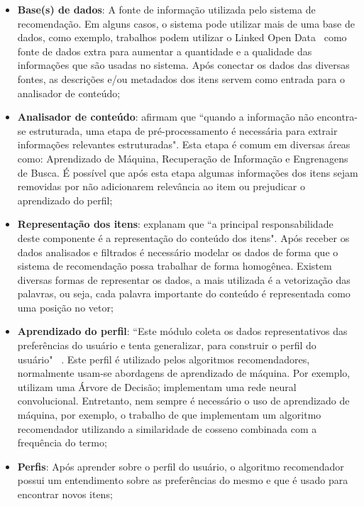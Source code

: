 \begin{itemize}
	\item{\textbf{Base(s) de dados}: A fonte de informação utilizada pelo sistema de recomendação. Em alguns casos, o sistema pode utilizar mais de uma base de dados, como exemplo, trabalhos podem utilizar o Linked Open Data~ \cite{Bizer:2009} como fonte de dados extra para aumentar a quantidade e a qualidade das informações que são usadas no sistema. Após conectar os dados das diversas fontes, as descrições e/ou metadados dos itens servem como entrada para o analisador de conteúdo;
	}

	\item{\textbf{Analisador de conteúdo}:  afirmam que ``quando a informação não encontra-se estruturada, uma etapa de pré-processamento é necessária para extrair informações relevantes estruturadas". Esta etapa é comum em diversas áreas como: Aprendizado de Máquina, Recuperação de Informação e Engrenagens de Busca. É possível que após esta etapa algumas informações dos itens sejam removidas por não adicionarem relevância ao item ou prejudicar o aprendizado do perfil;
	}

	\item{\textbf{Representação dos itens}:  explanam que ``a principal responsabilidade deste componente é a representação do conteúdo dos itens". Após receber os dados analisados e filtrados é necessário modelar os dados de forma que o sistema de recomendação possa trabalhar de forma homogênea. Existem diversas formas de representar os dados, a mais utilizada é a vetorização das palavras, ou seja, cada palavra importante do conteúdo é representada como uma posição no vetor;
	}
	
	\item{\textbf{Aprendizado do perfil}: ``Este módulo coleta os dados representativos das preferências do usuário e tenta generalizar, para construir o perfil do usuário"~ \cite{Lops:2011}. Este perfil é utilizado pelos algoritmos recomendadores, normalmente usam-se abordagens de aprendizado de máquina. Por exemplo,  utilizam uma Árvore de Decisão;  implementam uma rede neural convolucional. Entretanto, nem sempre é necessário o uso de aprendizado de máquina, por exemplo, o trabalho de  que implementam um algoritmo recomendador utilizando a similaridade de cosseno combinada com a frequência do termo;
	}
	
	\item{\textbf{Perfis}: Após aprender sobre o perfil do usuário, o algoritmo recomendador possui um entendimento sobre as preferências do mesmo e que é usado para encontrar novos itens;
	}
	

\end{itemize}
